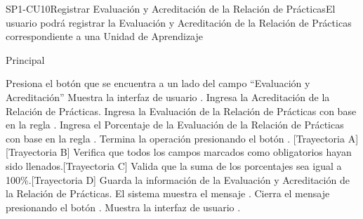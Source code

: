 \begin{UseCase}{SP1-CU10}{Registrar Evaluación y Acreditación de la Relación de Prácticas}{El usuario podrá registrar la Evaluación y Acreditación de la Relación de Prácticas correspondiente a una Unidad de Aprendizaje}

\end{UseCase}

\begin{UCtrayectoria}{Principal}
    
    \UCpaso[\UCactor] Presiona el botón \BtnModal que se encuentra a un lado del campo ``Evaluación y Acreditación'' 
    \UCpaso Muestra la interfaz de usuario .
    \UCpaso[\UCactor] Ingresa la Acreditación de la Relación de Prácticas.
    \UCpaso[\UCactor] Ingresa la Evaluación de la Relación de Prácticas con base en la regla .
    \UCpaso[\UCactor] Ingresa el Porcentaje de la Evaluación de la Relación de Prácticas con base en la regla .
    \UCpaso[\UCactor] Termina la operación presionando el botón . [Trayectoria A][Trayectoria B]
    \UCpaso Verifica que todos los campos marcados como obligatorios hayan sido llenados.[Trayectoria C]
    \UCpaso Valida que la suma de los porcentajes sea igual a 100\%.[Trayectoria D]
    \UCpaso Guarda la información de la Evaluación y Acreditación de la Relación de Prácticas.
    \UCpaso El sistema muestra el mensaje .
    \UCpaso[\UCactor] Cierra el mensaje presionando el botón . 
    \UCpaso Muestra la interfaz de usuario  .
\end{UCtrayectoria}

